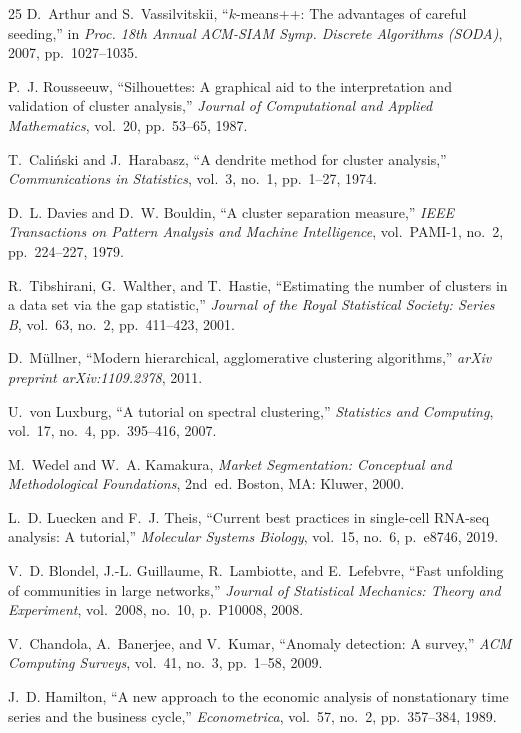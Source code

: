 \documentclass[conference]{IEEEtran}
\begin{document}
\begin{thebibliography}{25}
D.~Arthur and S.~Vassilvitskii,
``$k$-means++: The advantages of careful seeding,''
in \textit{Proc. 18th Annual ACM-SIAM Symp. Discrete Algorithms (SODA)}, 2007, pp.~1027--1035.

P.~J. Rousseeuw,
``Silhouettes: A graphical aid to the interpretation and validation of cluster analysis,''
\textit{Journal of Computational and Applied Mathematics}, vol.~20, pp.~53--65, 1987.

T.~Cali{\'n}ski and J.~Harabasz,
``A dendrite method for cluster analysis,''
\textit{Communications in Statistics}, vol.~3, no.~1, pp.~1--27, 1974.

D.~L. Davies and D.~W. Bouldin,
``A cluster separation measure,''
\textit{IEEE Transactions on Pattern Analysis and Machine Intelligence}, vol.~PAMI-1, no.~2, pp.~224--227, 1979.

R.~Tibshirani, G.~Walther, and T.~Hastie,
``Estimating the number of clusters in a data set via the gap statistic,''
\textit{Journal of the Royal Statistical Society: Series B}, vol.~63, no.~2, pp.~411--423, 2001.

D.~M{\"u}llner,
``Modern hierarchical, agglomerative clustering algorithms,''
\textit{arXiv preprint arXiv:1109.2378}, 2011.

U.~von Luxburg,
``A tutorial on spectral clustering,''
\textit{Statistics and Computing}, vol.~17, no.~4, pp.~395--416, 2007.

M.~Wedel and W.~A. Kamakura,
\textit{Market Segmentation: Conceptual and Methodological Foundations}, 2nd~ed.
Boston, MA: Kluwer, 2000.

L.~D. Luecken and F.~J. Theis,
``Current best practices in single-cell RNA-seq analysis: A tutorial,''
\textit{Molecular Systems Biology}, vol.~15, no.~6, p.~e8746, 2019.

V.~D. Blondel, J.-L. Guillaume, R.~Lambiotte, and E.~Lefebvre,
``Fast unfolding of communities in large networks,''
\textit{Journal of Statistical Mechanics: Theory and Experiment}, vol.~2008, no.~10, p.~P10008, 2008.

V.~Chandola, A.~Banerjee, and V.~Kumar,
``Anomaly detection: A survey,''
\textit{ACM Computing Surveys}, vol.~41, no.~3, pp.~1--58, 2009.

J.~D. Hamilton,
``A new approach to the economic analysis of nonstationary time series and the business cycle,''
\textit{Econometrica}, vol.~57, no.~2, pp.~357--384, 1989.


\end{thebibliography}
\end{document}
